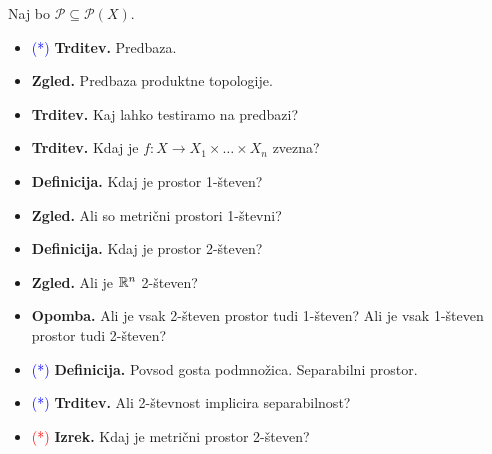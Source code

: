 \begin{enumerate}
    Naj bo \(\mathcal{P} \subseteq \mathcal{P}(X)\).
    \begin{itemize}
        \item \textcolor{blue}{(*)} \textbf{Trditev.} Predbaza.
        \item \textbf{Zgled.} Predbaza produktne topologije.
        \item \textbf{Trditev.} Kaj lahko testiramo na predbazi?
        \item \textbf{Trditev.} Kdaj je \(f: X \to X_1 \times \ldots \times X_n\) zvezna?
        \item \textbf{Definicija.} Kdaj je prostor 1-števen?
        \item \textbf{Zgled.} Ali so metrični prostori 1-števni?
        \item \textbf{Definicija.} Kdaj je prostor 2-števen?
        \item \textbf{Zgled.} Ali je \(\mathbb{R}^n\) 2-števen?
        \item \textbf{Opomba.} Ali je vsak 2-števen prostor tudi 1-števen? Ali je vsak 1-števen prostor tudi 2-števen?
        \item \textcolor{blue}{(*)} \textbf{Definicija.} Povsod gosta podmnožica. Separabilni prostor.
        \item \textcolor{blue}{(*)} \textbf{Trditev.} Ali 2-števnost implicira separabilnost?
        \item \textcolor{red}{(*)} \textbf{Izrek.} Kdaj je metrični prostor 2-števen?
    \end{itemize}
\end{enumerate}

